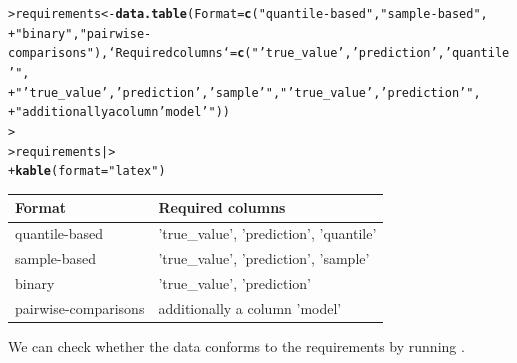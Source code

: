 \documentclass[article,shortnames]{jss}\usepackage[]{graphicx}\usepackage[]{color}
\makeatletter
\newcommand{\hlstr}[1]{\textcolor[rgb]{0.192,0.494,0.8}{#1}}%
\newcommand{\hlstd}[1]{\textcolor[rgb]{0.345,0.345,0.345}{#1}}%
\newcommand{\hlkwb}[1]{\textcolor[rgb]{0.69,0.353,0.396}{#1}}%
\newcommand{\hlkwc}[1]{\textcolor[rgb]{0.333,0.667,0.333}{#1}}%
\newcommand{\hlkwd}[1]{\textcolor[rgb]{0.737,0.353,0.396}{\textbf{#1}}}%
\newenvironment{kframe}{%
 \def\at@end@of@kframe{}%
 \ifinner\ifhmode%
  \def\at@end@of@kframe{\end{minipage}}%
  \begin{minipage}{\columnwidth}%
 \fi\fi%
 \def\FrameCommand##1{\hskip\@totalleftmargin \hskip-\fboxsep
 \colorbox{shadecolor}{##1}\hskip-\fboxsep
     \hskip-\linewidth \hskip-\@totalleftmargin \hskip\columnwidth}%
 \MakeFramed {\advance\hsize-\width
   \@totalleftmargin\z@ \linewidth\hsize
   \@setminipage}}%
 {\par\unskip\endMakeFramed%
 \at@end@of@kframe}
\newenvironment{knitrout}{}{} %
\newcommand{\fct}[1]{\code{#1()}}
\makeatother
\begin{document}
\begin{knitrout}
\color{fgcolor}\begin{kframe}
\begin{alltt}
\hlstd{> }\hlstd{requirements} \hlkwb{<-} \hlkwd{data.table}\hlstd{(}\hlkwc{Format} \hlstd{=} \hlkwd{c}\hlstd{(}\hlstr{"quantile-based"}\hlstd{,} \hlstr{"sample-based"}\hlstd{,}
\hlstd{+ }    \hlstr{"binary"}\hlstd{,} \hlstr{"pairwise-comparisons"}\hlstd{),} \hlkwc{`Required columns`} \hlstd{=} \hlkwd{c}\hlstd{(}\hlstr{"'true_value', 'prediction', 'quantile'"}\hlstd{,}
\hlstd{+ }    \hlstr{"'true_value', 'prediction', 'sample'"}\hlstd{,} \hlstr{"'true_value', 'prediction'"}\hlstd{,}
\hlstd{+ }    \hlstr{"additionally a column 'model'"}\hlstd{))}
\hlstd{> }
\hlstd{> }\hlstd{requirements |>}
\hlstd{+ }    \hlkwd{kable}\hlstd{(}\hlkwc{format} \hlstd{=} \hlstr{"latex"}\hlstd{)}
\end{alltt}
\end{kframe}
\begin{tabular}{l|l}
\hline
Format & Required columns\\
\hline
quantile-based & 'true\_value', 'prediction', 'quantile'\\
\hline
sample-based & 'true\_value', 'prediction', 'sample'\\
\hline
binary & 'true\_value', 'prediction'\\
\hline
pairwise-comparisons & additionally a column 'model'\\
\hline
\end{tabular}

\end{knitrout}

We can check whether the data conforms to the requirements by running \fct{check\_forecasts}. 
\end{document}
